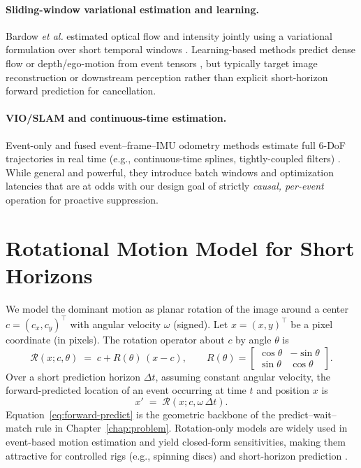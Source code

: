 \paragraph{Sliding-window variational estimation and learning.}
Bardow \emph{et al.} estimated optical flow and intensity jointly using a variational formulation over short temporal windows \cite{Bardow2016SOFIE}. Learning-based methods predict dense flow or depth/ego-motion from event tensors \cite{Zhu2018FlowNet,Zhu2019Unsupervised,Rebecq2019E2VID}, but typically target image reconstruction or downstream perception rather than explicit short-horizon forward prediction for cancellation.

\paragraph{VIO/SLAM and continuous-time estimation.}
Event-only and fused event–frame–IMU odometry methods estimate full 6-DoF trajectories in real time (e.g., continuous-time splines, tightly-coupled filters) \cite{Rebecq2017EVO,Gallego2018CMax,Niu2024TRO,Guo2024TRO}. While general and powerful, they introduce batch windows and optimization latencies that are at odds with our design goal of strictly \emph{causal, per-event} operation for proactive suppression.

\section{Rotational Motion Model for Short Horizons}
We model the dominant motion as planar rotation of the image around a center $c=(c_x,c_y)^\top$ with angular velocity $\omega$ (signed). Let $x=(x,y)^\top$ be a pixel coordinate (in pixels). The rotation operator about $c$ by angle $\theta$ is
\begin{equation}
\mathcal{R}(x; c, \theta) \;=\; c + R(\theta)\,(x-c), 
\qquad
R(\theta) = 
\begin{bmatrix}
\cos\theta & -\sin\theta\\
\sin\theta & \cos\theta
\end{bmatrix}.
\label{eq:rot-op}
\end{equation}
Over a short prediction horizon $\Delta t$, assuming constant angular velocity, the forward-predicted location of an event occurring at time $t$ and position $x$ is
\begin{equation}
x' \;=\; \mathcal{R}\!\left(x; c, \omega\,\Delta t\right).
\label{eq:forward-predict}
\end{equation}
Equation~\eqref{eq:forward-predict} is the geometric backbone of the predict–wait–match rule in Chapter~\ref{chap:problem}. Rotation-only models are widely used in event-based motion estimation and yield closed-form sensitivities, making them attractive for controlled rigs (e.g., spinning discs) and short-horizon prediction \cite{Gallego2017Angular,Gallego2018CMax,Stoffregen2019Segmentation}.

